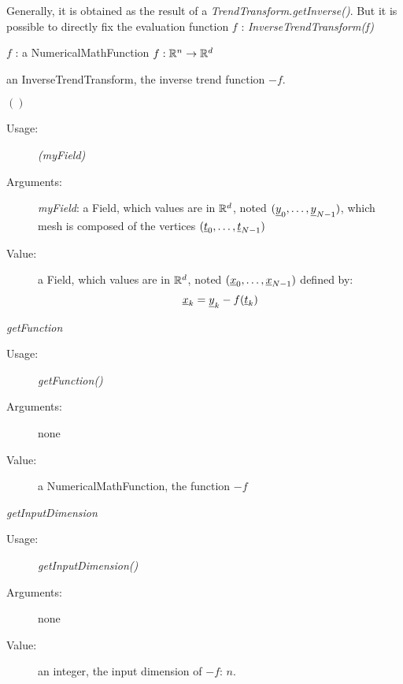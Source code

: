 \begin{description}

\item[Usage:] Generally, it is obtained as the result of a \textit{TrendTransform.getInverse()}. But it is possible to directly fix the evaluation function $f$ : \textit{InverseTrendTransform(f)}
\bigskip

\item[Arguments:]  \rule{0pt}{1em}
\begin{description}
\item $f$ : a NumericalMathFunction $f: {\mathbb R}^n \rightarrow {\mathbb R}^d$
\end{description}
\bigskip

\item[Value:] an InverseTrendTransform, the inverse trend function $-f$.
\bigskip

\item[Some methods :]  \rule{0pt}{1em}

\begin{description}

\item $()$
\begin{description}
\item[Usage:] \textit{(myField)}
\item[Arguments:] \textit{myField}: a Field, which values are in ${\mathbb R}^d$, noted  $({\underline{y}}_0, \dots, {\underline{y}}_{N-1})$, which mesh is composed of the vertices $({\underline{t}}_0, \dots, {\underline{t}}_{N-1})$
\item[Value:]   a Field, which values are in ${\mathbb R}^d$, noted  $({\underline{x}}_0, \dots, {\underline{x}}_{N-1})$ defined by:
\begin{equation}
{\underline{x}}_k = {\underline{y}}_k - f({\underline{t}}_k)
\end{equation}
\end{description}
\bigskip


\item \textit{getFunction}
\begin{description}
\item[Usage:] \textit{getFunction()}
\item[Arguments:] none
\item[Value:]  a NumericalMathFunction, the function $-f$
\end{description}
\bigskip

\item \textit{getInputDimension}
\begin{description}
\item[Usage:] \textit{getInputDimension()}
\item[Arguments:] none
\item[Value:]   an integer, the input dimension of $-f$: $n$.
\end{description}
\bigskip


\end{description}
\end{description}
